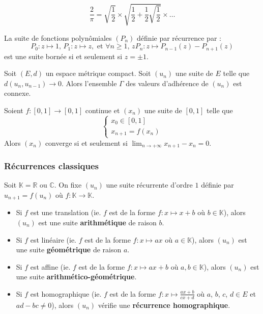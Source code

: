 	\begin{application}
		\[ \frac{2}{\pi} = \sqrt{\frac{1}{2}} \times \sqrt{\frac{1}{2} + \frac{1}{2} \sqrt{\frac{1}{2}}} \times \dots \]
	\end{application}
	
	
	\begin{example}
		La suite de fonctions polynômiales $(P_n)$ définie par récurrence par :
		\[ P_0 : z \mapsto 1, \, P_1 : z \mapsto z, \text{ et } \forall n \geq 1, \, zP_n : z \mapsto P_{n-1}(z)-P_{n+1}(z) \]
		est une suite bornée si et seulement si $z = \pm 1$.
	\end{example}
	
	
	\begin{theorem}
		Soit $(E, d)$ un espace métrique compact. Soit $(u_n)$ une suite de $E$ telle que $d(u_n,u_{n-1}) \longrightarrow 0$. Alors l'ensemble $\Gamma$ des valeurs d'adhérence de $(u_n)$ est connexe.
	\end{theorem}
	
	\begin{corollary}
		Soient $f : [0, 1] \rightarrow [0, 1]$ continue et $(x_n)$ une suite de $[0, 1]$ telle que
		\[ \begin{cases} x_0 \in [0, 1] \\ x_{n+1} = f(x_n) \end{cases} \]
		Alors $(x_n)$ converge si et seulement si $\lim_{n \rightarrow +\infty } x_{n+1} - x_n = 0$.
	\end{corollary}
	
	\subsubsection{Récurrences classiques}
	
	
	Soit $\mathbb{K} = \mathbb{R}$ ou $\mathbb{C}$. On fixe $(u_n)$ une suite récurrente d'ordre $1$ définie par $u_{n+1} = f(u_n)$ où $f : \mathbb{K} \rightarrow \mathbb{K}$.
	
	\begin{definition}
		\begin{itemize}
			\item Si $f$ est une translation (ie. $f$ est de la forme $f : x \mapsto x + b$ où $b \in \mathbb{K}$), alors $(u_n)$ est une suite \textbf{arithmétique} de raison $b$.
			\item Si $f$ est linéaire (ie. $f$ est de la forme $f : x \mapsto ax$ où $a \in \mathbb{K}$), alors $(u_n)$ est une suite \textbf{géométrique} de raison $a$.
			\item Si $f$ est affine (ie. $f$ est de la forme $f : x \mapsto ax + b$ où $a, b \in \mathbb{K}$), alors $(u_n)$ est une suite \textbf{arithmético-géométrique}.
			\item Si $f$ est homographique (ie. $f$ est de la forme $f : x \mapsto \frac{ax + b}{cx + d}$ où $a$, $b$, $c$, $d \in E$ et $ad - bc \neq 0$), alors $(u_n)$ vérifie une \textbf{récurrence homographique}.
		\end{itemize}
	\end{definition}
	
